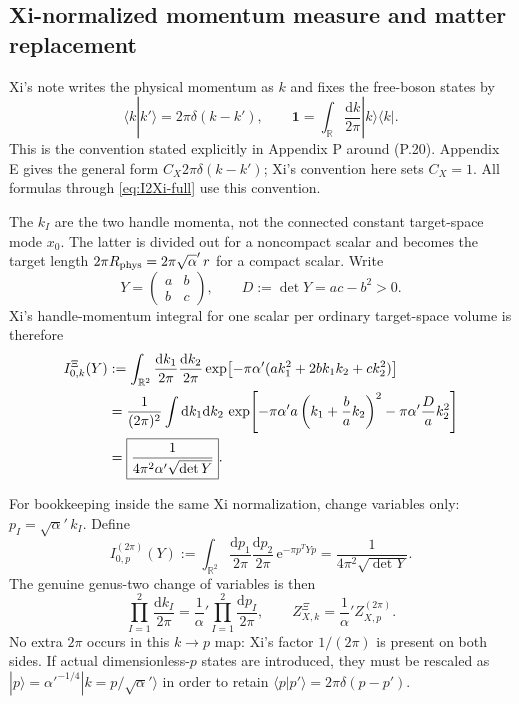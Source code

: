 \documentclass[11pt]{article}
\numberwithin{equation}{section}
\newcommand{\A}{\alpha'}
\newcommand{\dd}{\mathrm d}
\newcommand{\ee}{\mathrm e}
\begin{document}
\subsection{Xi-normalized momentum measure and matter replacement}

Xi's note writes the physical momentum as $k$ and fixes the free-boson states
by
\begin{equation}
 \boxed{
 \langle k|k'\rangle=2\pi\delta(k-k'),
 \qquad
 \mathbf 1=\int_{\mathbb R}\frac{\dd k}{2\pi}|k\rangle\langle k|.}
 \label{eq:xi-k-state-normalization}
\end{equation}
This is the convention stated explicitly in Appendix P around (P.20).
Appendix E gives the general form $C_X2\pi\delta(k-k')$; Xi's convention here
sets $C_X=1$.  All formulas through \eqref{eq:I2Xi-full} use this convention.

The $k_I$ are the two handle momenta, not the connected constant target-space
mode $x_0$.  The latter is divided out for a noncompact scalar and becomes the
target length $2\pi R_{\rm phys}=2\pi\sqrt\A\,r$ for a compact scalar.  Write
\begin{equation}
 Y=\begin{pmatrix}a&b\\b&c\end{pmatrix},
 \qquad D:=\det Y=ac-b^2>0.
\end{equation}
Xi's handle-momentum integral for one scalar per ordinary target-space volume
is therefore
\begin{align}
 I_{0,k}^{\Xi}(Y)
 &:=\int_{\mathbb R^2}\frac{\dd k_1}{2\pi}
 \frac{\dd k_2}{2\pi}
 \exp\!\left[-\pi\A(ak_1^2+2bk_1k_2+ck_2^2)\right] \notag\\
 &=\frac1{(2\pi)^2}
 \int\dd k_1\dd k_2\,
 \exp\!\left[-\pi\A a\left(k_1+\frac ba k_2\right)^2
 -\pi\A\frac Da k_2^2\right] \notag\\
 &=\boxed{\frac1{4\pi^2\A\sqrt{\det Y}}}.
 \label{eq:k-zero-mode-integral}
\end{align}

For bookkeeping inside the same Xi normalization, change variables only:
$p_I=\sqrt\A\,k_I$.  Define
\begin{equation}
 I_{0,p}^{(2\pi)}(Y)
 :=\int_{\mathbb R^2}\frac{\dd p_1}{2\pi}
 \frac{\dd p_2}{2\pi}\,\ee^{-\pi p^TYp}
 =\frac1{4\pi^2\sqrt{\det Y}}.
 \label{eq:xi-p-zero-mode-integral}
\end{equation}
The genuine genus-two change of variables is then
\begin{equation}
 \prod_{I=1}^2\frac{\dd k_I}{2\pi}
 =\frac1\A\prod_{I=1}^2\frac{\dd p_I}{2\pi},
 \qquad
 \boxed{Z_{X,k}^\Xi=\frac1\A Z_{X,p}^{(2\pi)}}.
 \label{eq:scalar-conversion-full}
\end{equation}
No extra $2\pi$ occurs in this $k\to p$ map: Xi's factor $1/(2\pi)$ is
present on both sides.  If actual dimensionless-$p$ states are introduced,
they must be rescaled as
$|p\rangle=\A^{-1/4}|k=p/\sqrt\A\rangle$ in order to retain
$\langle p|p'\rangle=2\pi\delta(p-p')$.
\end{document}
